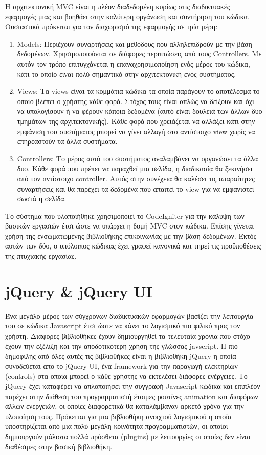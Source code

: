 Η αρχιτεκτονική MVC είναι η πλέον διαδεδομένη κυρίως στις διαδικτυακές εφαρμογές μιας και βοηθάει στην καλύτερη οργάνωση και συντήρηση του κώδικα. Ουσιαστικά πρόκειται για τον διαχωρισμό της εφαρμογής σε τρία μέρη:
\begin{enumerate}
\item Models: Περιέχουν συναρτήσεις και μεθόδους που αλληλεπιδρούν με την βάση δεδομένων. Χρησιμοποιούνται σε διάφορες περιπτώσεις από τους Controllers. Με αυτόν τον τρόπο επιτυγχάνεται η επαναχρησιμοποίηση ενός μέρος του κώδικα, κάτι το οποίο είναι πολύ σημαντικό στην αρχιτεκτονική ενός συστήματος.
\item Views: Τα views είναι τα κομμάτια κώδικα τα οποία παράγουν το αποτέλεσμα το οποίο βλέπει ο χρήστης κάθε φορά. Στόχος τους είναι απλώς να δείξουν και όχι να υπολογίσουν ή να φέρουν κάποια δεδομένα (αυτό είναι δουλειά των άλλων δυο τμημάτων της αρχιτεκτονικής). Κάθε φορά που χρειάζεται να αλλάξει κάτι στην εμφάνιση του συστήματος μπορεί να γίνει αλλαγή στο αντίστοιχο view χωρίς να επηρεαστούν τα άλλα συστήματα. 
\item Controllers: Το μέρος αυτό του συστήματος αναλαμβάνει να οργανώσει τα άλλα δυο. Κάθε φορά που πρέπει να παραχθεί μια σελίδα, η διαδικασία θα ξεκινήσει από τον αντίστοιχο controller. Αυτός στην συνέχεια θα καλέσει τις απαραίτητες συναρτήσεις και θα παρέχει τα δεδομένα που απαιτεί το view για να εμφανιστεί σωστά η σελίδα.
\end{enumerate}

Το σύστημα που υλοποιήθηκε χρησιμοποιεί το CodeIgniter για την κάλυψη των βασικών εργασιών έτσι ώστε να υπάρχει η δομή MVC στον κώδικα. Επίσης γίνεται χρήση της ενσωματωμένης βιβλιοθήκης επικοινωνίας με την βάση δεδομένων. Εκτός αυτών των δύο, ο υπόλοιπος κώδικας έχει γραφεί κανονικά και τηρεί τις προϋποθέσεις της πτυχιακής εργασίας.

\section {jQuery \& jQuery UI}
Ένα μεγάλο μέρος των σύγχρονων διαδικτυακών εφαρμογών βασίζει την λειτουργία του σε κώδικα Javascript έτσι ώστε να κάνει το λογισμικό πιο φιλικό προς τον χρήστη. Διάφορες βιβλιοθήκες έχουν δημιουργηθεί τα τελευταία χρόνια που στόχο έχουν την εξέλιξη και την αποδοτικότερη χρήση της γλώσσας javscript. Η πιο δημοφιλής από όλες αυτές τις βιβλιοθήκες είναι η βιβλιοθήκη jQuery η οποία συνοδεύεται απο το jQuery UI, ένα framework για την παραγωγή ελεκτηρίων (controls) στα οποία μπορεί ο κάθε χρήστης να εκτελέσει διάφορες ενέργειες. Το jQuery έχει καταφέρει να απλοποιήσει την συγγραφή Javascript κώδικα και επιπλέον παρέχει στην διάθεση του προγραμματιστή έτοιμες ρουτίνες animation και διαφόρων άλλων ενεργειών, οι οποίες διαφορετικά θα καταλάμβαναν αρκετό χρόνο για την υλοποίηση τους. Πρόκειται για μια βιβλιοθήκη ανοιχτού λογισμικού η οποία υποστηρίζεται από μια πολύ μεγάλη κοινότητα προγραμματιστών, οι οποίοι δημιουργούν μάλιστα πολλά πρόσθετα (plugins) με λειτουργίες οι οποίες δεν είναι διαθέσιμες στην βασική βιβλιοθήκη.

